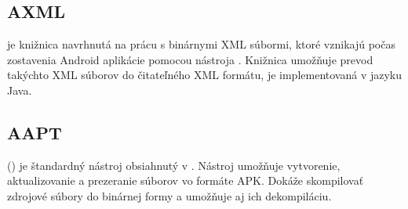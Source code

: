 \subsection{AXML}
\label{AXML}
 je knižnica navrhnutá na prácu s binárnymi XML súbormi, ktoré vznikajú počas zostavenia Android aplikácie pomocou nástroja . Knižnica umožňuje prevod takýchto XML súborov do čitateľného XML formátu, je implementovaná v jazyku Java.


\subsection{AAPT}
\label{AAPT}

 () je štandardný nástroj obsiahnutý v . Nástroj  umožňuje vytvorenie, aktualizovanie a prezeranie súborov vo formáte APK. Dokáže skompilovať zdrojové súbory do binárnej formy a umožňuje aj ich dekompiláciu\cite{aapt}.

